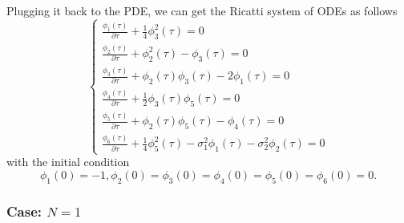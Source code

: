 \documentclass{article}
\begin{document}
Plugging it back to the PDE, we can get the Ricatti system of ODEs as follows
\begin{equation*}
    \begin{cases}
   \frac{\phi_{1}(\tau)}{\partial \tau} + \frac{1}{4} \phi_{3}^{2}(\tau) = 0 \\
   \frac{\phi_{2}(\tau)}{\partial \tau} + \phi_{2}^{2}(\tau) - \phi_{3}(\tau) = 0 \\
   \frac{\phi_{3}(\tau)}{\partial \tau} + \phi_{2}(\tau)\phi_{3}(\tau) - 2 \phi_{1}(\tau) = 0 \\
   \frac{\phi_{4}(\tau)}{\partial \tau} + \frac{1}{2} \phi_{3} (\tau) \phi_{5}(\tau) = 0 \\
   \frac{\phi_{5}(\tau)}{\partial \tau} + \phi_{2} (\tau) \phi_{5}(\tau) - \phi_{4}(\tau) = 0 \\
   \frac{\phi_{6}(\tau)}{\partial \tau} + \frac{1}{4} \phi_{5}^{2} (\tau) - \sigma_{1}^{2} \phi_{1}(\tau) - \sigma_{2}^{2} \phi_{2}(\tau) = 0
   \end{cases}
\end{equation*}
with the initial condition
\begin{equation*}
    \phi_{1}(0) = -1, \phi_{2}(0) = \phi_{3}(0) = \phi_{4}(0) = \phi_{5}(0) = \phi_{6}(0) = 0.
\end{equation*}

\subsubsection{Case: $N = 1$}
\end{document}
